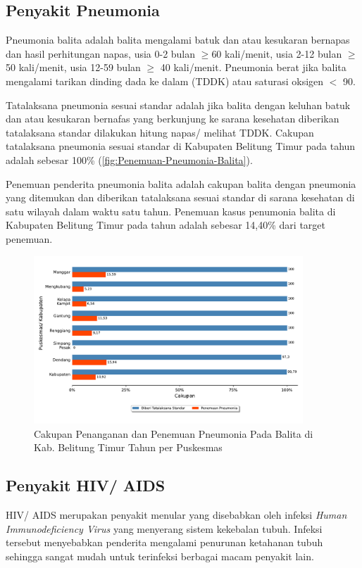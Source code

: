 \subsection{Penyakit Pneumonia}
Pneumonia balita adalah balita mengalami batuk dan atau kesukaran bernapas dan hasil perhitungan napas, usia 0-2 bulan $\geq$60 kali/menit, usia 2-12 bulan $\geq$ 50 kali/menit, usia 12-59 bulan $\geq$ 40 kali/menit. Pneumonia berat jika balita mengalami tarikan dinding dada ke dalam (TDDK) atau saturasi oksigen $<$ 90.\

Tatalaksana pneumonia sesuai standar adalah jika balita dengan keluhan batuk dan atau kesukaran bernafas yang berkunjung ke sarana kesehatan diberikan tatalaksana standar dilakukan hitung napas/ melihat TDDK. Cakupan tatalaksana pneumonia sesuai standar di Kabupaten Belitung Timur pada tahun \tP adalah sebesar 100\% (\autoref{fig:Penemuan-Pneumonia-Balita}).

Penemuan penderita pneumonia balita adalah cakupan balita dengan pneumonia yang ditemukan dan diberikan tatalaksana sesuai standar di sarana kesehatan di satu wilayah dalam waktu satu tahun. Penemuan kasus penumonia balita di Kabupaten Belitung Timur pada tahun \tP adalah sebesar 14,40\% dari target penemuan.

\begin{figure}[H]
    \centering
    \includegraphics[width=0.9\textwidth]{bab_06/bab_06_02_pneumoniaBalita}
    \caption{Cakupan Penanganan dan Penemuan Pneumonia Pada Balita di Kab. Belitung Timur Tahun \tP per Puskesmas}
    \label{fig:Penemuan-Pneumonia-Balita}
\end{figure}


\subsection{Penyakit HIV/ AIDS}
HIV/ AIDS merupakan penyakit menular yang disebabkan oleh infeksi
\emph{Human Immunodeficiency Virus} yang menyerang sistem kekebalan tubuh.
Infeksi tersebut menyebabkan penderita mengalami penurunan ketahanan
tubuh sehingga sangat mudah untuk terinfeksi berbagai macam penyakit
lain.

